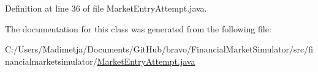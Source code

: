 Definition at line 36 of file Market\+Entry\+Attempt.\+java.



The documentation for this class was generated from the following file\+:\begin{DoxyCompactItemize}
\item 
C\+:/\+Users/\+Madimetja/\+Documents/\+Git\+Hub/bravo/\+Financial\+Market\+Simulator/src/financialmarketsimulator/\hyperlink{_market_entry_attempt_8java}{Market\+Entry\+Attempt.\+java}\end{DoxyCompactItemize}
